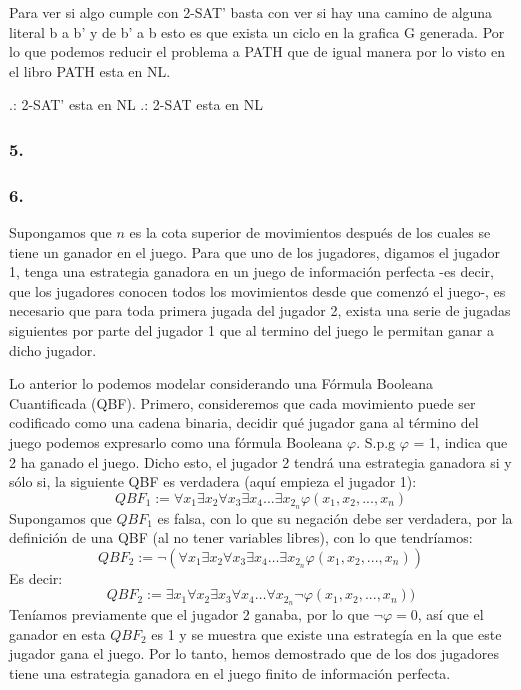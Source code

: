 \documentclass[12pt]{article}
\begin{document}
Para ver si algo cumple con 2-SAT’ basta con ver si hay una camino de alguna literal b a b’ y de b’ a b esto es que exista un ciclo en la grafica G generada. Por lo que podemos reducir el problema a PATH que de igual manera por lo visto en el libro PATH esta en NL.

.: 2-SAT’ esta en NL 
.: 2-SAT esta en NL

\subsubsection*{5.}

\subsubsection*{6.}
Supongamos que $n$ es la cota superior de movimientos después de los cuales se tiene un ganador en el juego. Para que uno de los jugadores, digamos el jugador 1,
tenga una estrategia ganadora en un juego de información perfecta -es decir, que los jugadores conocen todos los movimientos desde que comenzó el juego-, es necesario que para toda primera jugada del jugador 2, exista una serie de jugadas siguientes por parte del jugador 1 que al termino del juego le permitan ganar a dicho jugador.

Lo anterior lo podemos modelar considerando una Fórmula Booleana Cuantificada (QBF). Primero, consideremos que cada movimiento puede ser codificado como una cadena binaria, decidir qué jugador gana al término del juego podemos expresarlo como una fórmula Booleana $\varphi$. S.p.g $\varphi$ = 1, indica que 2 ha ganado el juego. Dicho esto, el jugador 2 tendrá una estrategia ganadora si y sólo si, la siguiente QBF es verdadera (aquí empieza el jugador 1):
\begin{equation}
  QBF_1 := \forall{x_1}\exists{x_2}\forall{x_3}\exists{x_4}\dots\exists{x_{2_n}} \varphi(x_1,x_2,...,x_n) 
\end{equation}
Supongamos que $QBF_1$ es falsa, con lo que su negación debe ser verdadera, por la definición de una QBF (al no tener variables libres),
con lo que tendríamos:
\begin{equation}
  QBF_2 := \neg(\forall{x_1}\exists{x_2}\forall{x_3}\exists{x_4}\dots\exists{x_{2_n}} \varphi(x_1,x_2,...,x_n))
\end{equation}
Es decir:
\begin{equation}
  QBF_2 := \exists{x_1}\forall{x_2}\exists{x_3}\forall{x_4}\dots\forall{x_{2_n}} \neg\varphi(x_1,x_2,...,x_n))
\end{equation}
Teníamos previamente que el jugador 2 ganaba, por lo que $\neg\varphi = 0$, así que el ganador en esta $QBF_2$ es 1 y se muestra que existe una
estrategía en la que este jugador gana el juego.
Por lo tanto, hemos demostrado que de los dos jugadores tiene una estrategia ganadora en el juego finito de información perfecta.
\end{document}
